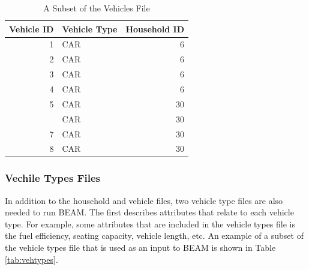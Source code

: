 \documentclass[12pt, oneside, openright]{byuthesis}
\begin{document}
\begin{table}

\caption{\label{tab:veh}A Subset of the Vehicles File}
\centering
\begin{tabular}[t]{rlr}
\toprule
Vehicle ID & Vehicle Type & Household ID\\
\midrule
1 & CAR & 6\\
2 & CAR & 6\\
3 & CAR & 6\\
4 & CAR & 6\\
5 & CAR & 30\\
\addlinespace
6 & CAR & 30\\
7 & CAR & 30\\
8 & CAR & 30\\
\bottomrule
\end{tabular}
\end{table}

\hypertarget{vechile-types-files}{%
\subsubsection{Vechile Types Files}\label{vechile-types-files}}

In addition to the household and vehicle files, two vehicle type files are also needed to run BEAM. The first describes attributes that relate to each vehicle type. For example, some attributes that are included in the vehicle types file is the fuel efficiency, seating capacity, vehicle length, etc. An example of a subset of the vehicle types file that is used as an input to BEAM is shown in Table \ref{tab:vehtypes}.
\end{document}
